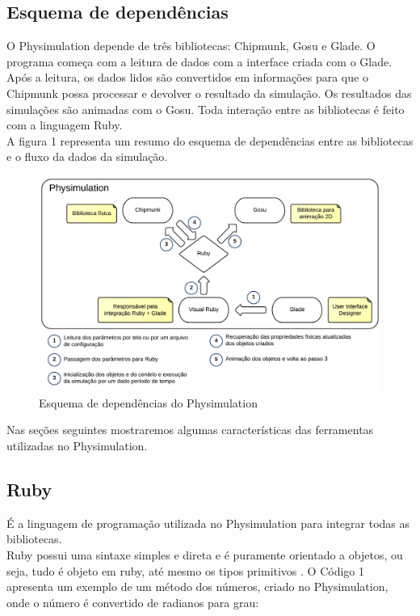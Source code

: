 \subsection{Esquema de dependências}
O Physimulation depende de três bibliotecas: Chipmunk, Gosu e Glade. O programa começa com a leitura de dados com a interface criada com o Glade. Após a leitura, 
os dados lidos são convertidos em informações para que o Chipmunk possa processar e devolver o resultado da simulação. Os resultados das simulações são animadas 
com o Gosu. Toda interação entre as bibliotecas é feito com a linguagem Ruby. \\

A figura 1 representa um resumo do esquema de dependências entre as bibliotecas e o fluxo da dados da simulação.

\begin{figure}[!htbp]
  \includegraphics[scale=0.2]{EsquemaDependencia.png}
  \caption{Esquema de dependências do Physimulation}
\end{figure}

Nas seções seguintes mostraremos algumas características das ferramentas utilizadas no Physimulation.

\subsection{Ruby}
É a linguagem de programação utilizada no Physimulation para integrar todas as bibliotecas.\\

Ruby possui uma sintaxe simples e direta e é puramente orientado a objetos, ou seja, tudo é objeto em ruby, até mesmo os tipos primitivos \cite{ruby:caelum}. O Código 1 apresenta um exemplo de um método dos números, criado no Physimulation, onde o 
número é convertido de radianos para grau:

